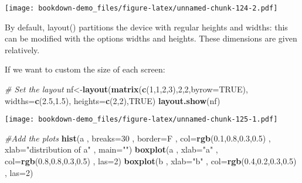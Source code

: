 \documentclass[]{book}
\newenvironment{Shaded}{\begin{snugshade}}{\end{snugshade}}
\newcommand{\KeywordTok}[1]{\textcolor[rgb]{0.13,0.29,0.53}{\textbf{#1}}}
\newcommand{\DataTypeTok}[1]{\textcolor[rgb]{0.13,0.29,0.53}{#1}}
\newcommand{\DecValTok}[1]{\textcolor[rgb]{0.00,0.00,0.81}{#1}}
\newcommand{\FloatTok}[1]{\textcolor[rgb]{0.00,0.00,0.81}{#1}}
\newcommand{\StringTok}[1]{\textcolor[rgb]{0.31,0.60,0.02}{#1}}
\newcommand{\CommentTok}[1]{\textcolor[rgb]{0.56,0.35,0.01}{\textit{#1}}}
\newcommand{\OtherTok}[1]{\textcolor[rgb]{0.56,0.35,0.01}{#1}}
\newcommand{\NormalTok}[1]{#1}
\theoremstyle{definition}
\theoremstyle{definition}
\theoremstyle{definition}
\theoremstyle{remark}
\begin{document}
\texttt{[image: bookdown-demo\_files/figure-latex/unnamed-chunk-124-2.pdf]}

By default, layout() partitions the device with regular heights and
widths: this can be modified with the options widths and heights. These
dimensions are given relatively.

If we want to custom the size of each screen:

\begin{Shaded}
\begin{Highlighting}[]
\CommentTok{# Set the layout}
\NormalTok{nf<-}\KeywordTok{layout}\NormalTok{(}\KeywordTok{matrix}\NormalTok{(}\KeywordTok{c}\NormalTok{(}\DecValTok{1}\NormalTok{,}\DecValTok{1}\NormalTok{,}\DecValTok{2}\NormalTok{,}\DecValTok{3}\NormalTok{),}\DecValTok{2}\NormalTok{,}\DecValTok{2}\NormalTok{,}\DataTypeTok{byrow=}\OtherTok{TRUE}\NormalTok{), }\DataTypeTok{widths=}\KeywordTok{c}\NormalTok{(}\FloatTok{2.5}\NormalTok{,}\FloatTok{1.5}\NormalTok{), }\DataTypeTok{heights=}\KeywordTok{c}\NormalTok{(}\DecValTok{2}\NormalTok{,}\DecValTok{2}\NormalTok{),}\OtherTok{TRUE}\NormalTok{) }
\KeywordTok{layout.show}\NormalTok{(nf)}
\end{Highlighting}
\end{Shaded}

\texttt{[image: bookdown-demo\_files/figure-latex/unnamed-chunk-125-1.pdf]}

\begin{Shaded}
\begin{Highlighting}[]
\CommentTok{#Add the plots}
\KeywordTok{hist}\NormalTok{(a , }\DataTypeTok{breaks=}\DecValTok{30}\NormalTok{ , }\DataTypeTok{border=}\NormalTok{F , }\DataTypeTok{col=}\KeywordTok{rgb}\NormalTok{(}\FloatTok{0.1}\NormalTok{,}\FloatTok{0.8}\NormalTok{,}\FloatTok{0.3}\NormalTok{,}\FloatTok{0.5}\NormalTok{) , }\DataTypeTok{xlab=}\StringTok{"distribution of a"}\NormalTok{ , }\DataTypeTok{main=}\StringTok{""}\NormalTok{)}
\KeywordTok{boxplot}\NormalTok{(a , }\DataTypeTok{xlab=}\StringTok{"a"}\NormalTok{ , }\DataTypeTok{col=}\KeywordTok{rgb}\NormalTok{(}\FloatTok{0.8}\NormalTok{,}\FloatTok{0.8}\NormalTok{,}\FloatTok{0.3}\NormalTok{,}\FloatTok{0.5}\NormalTok{) , }\DataTypeTok{las=}\DecValTok{2}\NormalTok{)}
\KeywordTok{boxplot}\NormalTok{(b , }\DataTypeTok{xlab=}\StringTok{"b"}\NormalTok{ , }\DataTypeTok{col=}\KeywordTok{rgb}\NormalTok{(}\FloatTok{0.4}\NormalTok{,}\FloatTok{0.2}\NormalTok{,}\FloatTok{0.3}\NormalTok{,}\FloatTok{0.5}\NormalTok{) , }\DataTypeTok{las=}\DecValTok{2}\NormalTok{)}
\end{Highlighting}
\end{Shaded}
\end{document}
